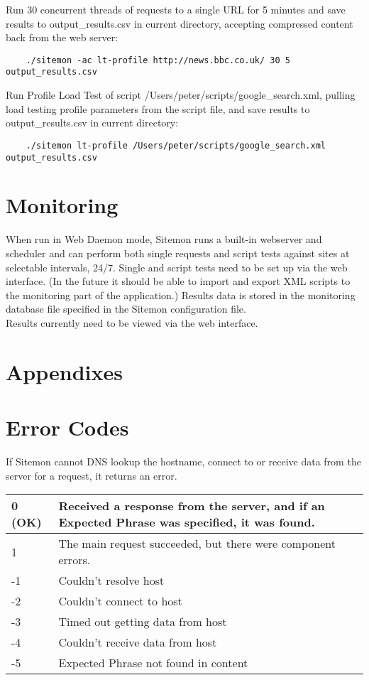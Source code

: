 \documentclass[a4paper]{article}
\begin{document}
Run 30 concurrent threads of requests to a single URL for 5 minutes and save results to output\_results.csv in current directory, accepting
 compressed content back from the web server:
\begin{verbatim}
	./sitemon -ac lt-profile http://news.bbc.co.uk/ 30 5 output_results.csv
\end{verbatim}

Run Profile Load Test of script /Users/peter/scripts/google\_search.xml, pulling load testing profile parameters from the script file, and save results to output\_results.csv in current directory:
\begin{verbatim}
	./sitemon lt-profile /Users/peter/scripts/google_search.xml output_results.csv
\end{verbatim}

\pagebreak

\section{Monitoring} \label{sec:monitoring}

When run in Web Daemon mode, Sitemon runs a built-in webserver and scheduler and can perform both single requests and 
 script tests against sites at selectable intervals, 24/7. Single and script tests need to be set up via the web interface. 
 (In the future it should be able to import and export XML scripts to the monitoring part of the application.)
 Results data is stored in the monitoring database file specified in the Sitemon configuration file.\\
 
 Results currently need to be viewed via the web interface.

\pagebreak

\section{Appendixes}

\appendix

\section{Error Codes}

If Sitemon cannot DNS lookup the hostname, connect to or receive data from the server for a request, it returns an error.\\

\begin{tabular}{ | l | l | }
\hline
  0 (OK) & Received a response from the server, and if an Expected Phrase was specified, it was found. \\ \hline
  1 & The main request succeeded, but there were component errors. \\ \hline
  -1 & Couldn't resolve host \\ \hline
  -2 & Couldn't connect to host \\ \hline
  -3 & Timed out getting data from host \\ \hline
  -4 & Couldn't receive data from host \\ \hline
  -5 & Expected Phrase not found in content \\ \hline
\end{tabular}
	
\end{document}
